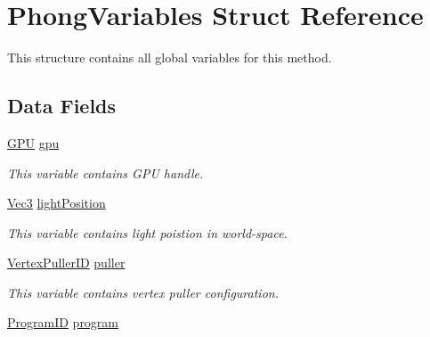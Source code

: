 \hypertarget{structPhongVariables}{}\section{Phong\+Variables Struct Reference}
\label{structPhongVariables}


This structure contains all global variables for this method.  


\subsection*{Data Fields}
\begin{DoxyCompactItemize}
\item 
\hyperlink{fwd_8h_a06964ec111fe28721d8618b6d0d993bf}{G\+PU} \hyperlink{structPhongVariables_a21952c475e05b5a507b05527459cfcb4}{gpu}\hypertarget{structPhongVariables_a21952c475e05b5a507b05527459cfcb4}{}\label{structPhongVariables_a21952c475e05b5a507b05527459cfcb4}

\begin{DoxyCompactList}\small\item\em This variable contains G\+PU handle. \end{DoxyCompactList}\item 
\hyperlink{structVec3}{Vec3} \hyperlink{structPhongVariables_aab37c6c27bf6eac7d326a34afb74c90c}{light\+Position}\hypertarget{structPhongVariables_aab37c6c27bf6eac7d326a34afb74c90c}{}\label{structPhongVariables_aab37c6c27bf6eac7d326a34afb74c90c}

\begin{DoxyCompactList}\small\item\em This variable contains light poistion in world-\/space. \end{DoxyCompactList}\item 
\hyperlink{fwd_8h_a23828e2281a794e193ebaf0df3e1f17c}{Vertex\+Puller\+ID} \hyperlink{structPhongVariables_a5a4dac9a79ccb16e1bcbb816ed20cc64}{puller}\hypertarget{structPhongVariables_a5a4dac9a79ccb16e1bcbb816ed20cc64}{}\label{structPhongVariables_a5a4dac9a79ccb16e1bcbb816ed20cc64}

\begin{DoxyCompactList}\small\item\em This variable contains vertex puller configuration. \end{DoxyCompactList}\item 
\hyperlink{fwd_8h_a15e62786033208aec9487a51e808f81d}{Program\+ID} \hyperlink{structPhongVariables_a1edd44ad4383517413bc026d8a0d95af}{program}\hypertarget{structPhongVariables_a1edd44ad4383517413bc026d8a0d95af}{}\label{structPhongVariables_a1edd44ad4383517413bc026d8a0d95af}


\end{DoxyCompactItemize}
